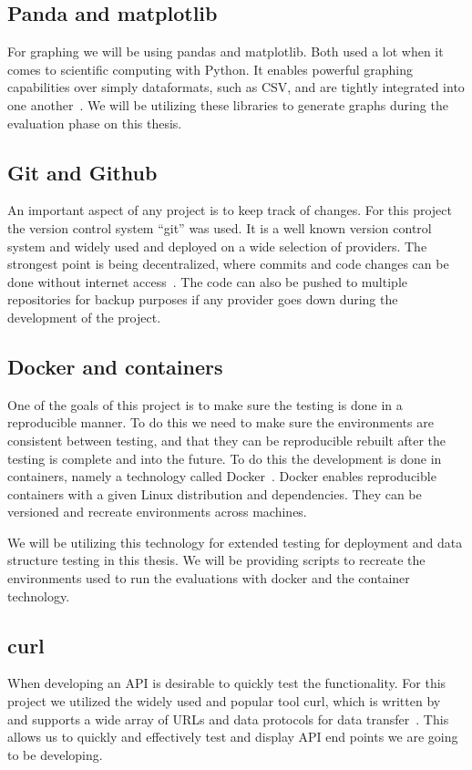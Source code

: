 \documentclass[../Main/thesis.tex]{subfiles}
\begin{document}
\subsection*{Panda and matplotlib}
For graphing we will be using pandas and matplotlib. Both used a lot when it
comes to scientific computing with Python. It enables powerful graphing
capabilities over simply dataformats, such as CSV, and are tightly integrated
into one another~\cite{pandas}\cite{matplotlib}. We will be utilizing these
libraries to generate graphs during the evaluation phase on this thesis.

\subsection*{Git and Github}%
\label{sub:git_and_github}
An important aspect of any project is to keep track of changes. For this project
the version control system ``git'' was used. It is a well known version control
system and widely used and deployed on a wide selection of providers. The
strongest point is being decentralized, where commits and code changes can be
done without internet access~\cite{git}. The code can also be pushed to multiple
repositories for backup purposes if any provider goes down during the
development of the project.


\subsection*{Docker and containers}%
\label{sub:docker_and_containers}
One of the goals of this project is to make sure the testing is done in a
reproducible manner. To do this we need to make sure the environments are
consistent between testing, and that they can be reproducible rebuilt after the
testing is complete and into the future. To do this the development is done in
containers, namely a technology called Docker~\cite{docker}. Docker enables
reproducible containers with a given Linux distribution and dependencies. They
can be versioned and recreate environments across machines.

We will be utilizing this technology for extended testing for deployment and
data structure testing in this thesis. We will be providing scripts to recreate
the environments used to run the evaluations with docker and the container
technology.

\subsection*{curl}%
\label{sub:curl}
When developing an API is desirable to quickly test the functionality. For this
project we utilized the widely used and popular tool curl, which is written
by~\citeauthor{curl} and supports a wide array of URLs and data protocols for
data transfer~\cite{curl}. This allows us to quickly and effectively test and
display API end points we are going to be developing.
\end{document}
